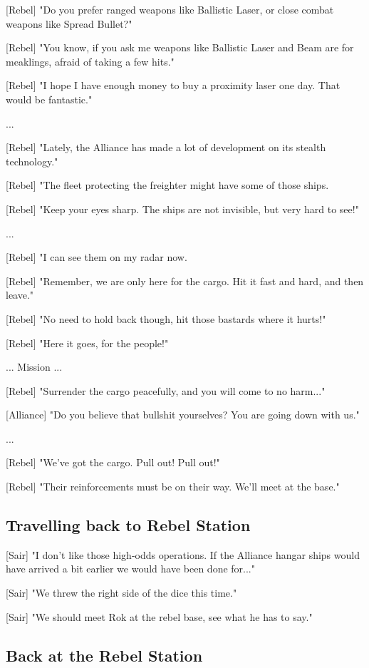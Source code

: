 \documentclass[a4paper,12pt]{article}
\begin{document}
[Rebel] "Do you prefer ranged weapons like Ballistic Laser, or close combat
weapons like Spread Bullet?" 

[Rebel] "You know, if you ask me weapons like Ballistic Laser and Beam
are for meaklings, afraid of taking a few hits."

[Rebel] "I hope I have enough money to buy a proximity laser one day. That would be fantastic."

...

[Rebel] "Lately, the Alliance has made a lot of development on its stealth technology."

[Rebel] "The fleet protecting the freighter might have some of those ships. 

[Rebel] "Keep your eyes sharp. The ships are not invisible, but very hard to see!"

...

[Rebel] "I can see them on my radar now. 

[Rebel] "Remember, we are only here for the cargo. Hit it fast and hard, and then leave."

[Rebel] "No need to hold back though, hit those bastards where it hurts!"

[Rebel] "Here it goes, for the people!"

... Mission ...

[Rebel] "Surrender the cargo peacefully, and you will come to no harm..."

[Alliance] "Do you believe that bullshit yourselves? You are going down with us."

...

[Rebel] "We've got the cargo. Pull out! Pull out!" 

[Rebel] "Their reinforcements must be on their way. We'll meet at the base."

\subsection{Travelling back to Rebel Station}

[Sair] "I don't like those high-odds operations. If the Alliance hangar ships would have
arrived a bit earlier we would have been done for..."

[Sair] "We threw the right side of the dice this time." 

[Sair] "We should meet Rok at the rebel base, see what he has to say."

\subsection{Back at the Rebel Station}
\end{document}
